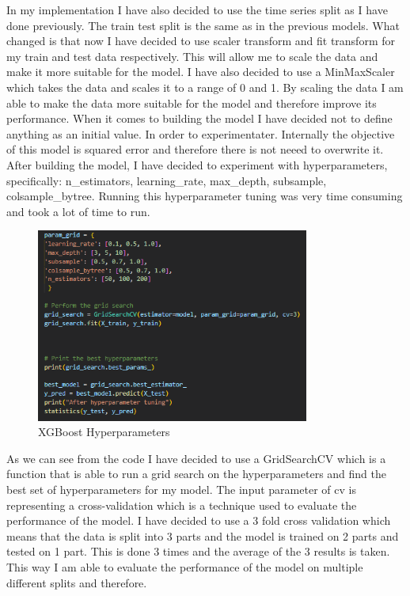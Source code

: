 \documentclass{imc-inf}
\begin{document}
			In my implementation I have also decided to use the time series split as I have done previously. The train test split is the same as in the previous models. What changed is that now I have decided to use 
			scaler transform and fit transform for my train and test data respectively. This will allow me to scale the data and make it more suitable for the model. I have also decided to use a MinMaxScaler which takes 
			the data and scales it to a range of 0 and 1. By scaling the data I am able to make the data more suitable for the model and therefore improve its performance. When it comes to building the model I have decided not to define
			anything as an initial value. In order to experimentater. Internally the objective of this model is squared error and therefore there is not neeed to overwrite it. After building the model, I have decided to 
			experiment with hyperparameters, specifically: n_estimators, learning_rate, max_depth, subsample, colsample_bytree. Running this hyperparameter tuning was very time consuming and took a lot of time to run. 
			\begin{figure}[h]
				\centering
				\includegraphics[width=0.8\textwidth]{xgboost_tuning_code.png}
				\caption{XGBoost Hyperparameters}
				\label{fig:xgboost_hyperparameters}
			\end{figure}
			As we can see from the code I have decided to use a GridSearchCV which is a function that is able to run a grid search on the hyperparameters and find the best set of hyperparameters for my model.
			The input parameter of cv is representing a cross-validation which is a technique used to evaluate the performance of the model. I have decided to use a 3 fold cross validation which means that the data is split into 3 parts and
			the model is trained on 2 parts and tested on 1 part. This is done 3 times and the average of the 3 results is taken. This way I am able to evaluate the performance of the model on multiple different splits and therefore.
\end{document}
